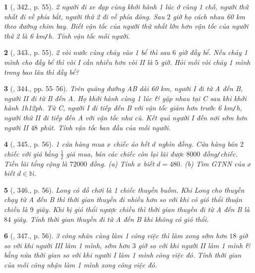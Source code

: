 \documentclass{article}
\newtheorem{baitoan}{}
\begin{document}
\begin{baitoan}[\cite{Binh_Toan_9_tap_2}, 342., p. 55]
	2 người đi xe đạp cùng khởi hành 1 lúc ở cùng 1 chỗ, người thứ nhất đi về phía bắt, người thứ 2 đi về phía đông. Sau $2$ giờ họ cách nhau {\rm60 km} theo đường chim bay. Biết vận tốc của người thứ nhất lớn hơn vận tốc của người thứ 2 là {\rm6 km{\tt/}h}. Tính vận tốc mỗi người.
\end{baitoan}

\begin{baitoan}[\cite{Binh_Toan_9_tap_2}, 343., p. 55]
	2 vòi nước cùng chảy vào 1 bể thì sau $6$ giờ đầy bể. Nếu chảy 1 mình cho đầy bể thì vòi I cần nhiều hơn vòi II là $5$ giờ. Hỏi mỗi vòi chảy 1 mình trong bao lâu thì đầy bể?
\end{baitoan}

\begin{baitoan}[\cite{Binh_Toan_9_tap_2}, 344., pp. 55--56]
	Trên quãng đường AB dài {\rm60 km}, người I đi từ A đến B, người II đi từ B đến A. Họ khởi hành cùng 1 lúc \& gặp nhau tại C sau khi khởi hành {\rm1h12ph}. Từ C, người I đi tiếp đến B với vận tốc giảm hơn trước {\rm6 km{\tt/}h}, người thứ II đi tiếp đến A với vận tốc như cũ. Kết quả người I đến nơi sớm hơn người II $48$ phút. Tính vận tốc ban đầu của mỗi người.
\end{baitoan}

\begin{baitoan}[\cite{Binh_Toan_9_tap_2}, 345., p. 56]
	1 cửa hàng mua $x$ chiếc áo hết $d$ nghìn đồng. Cửa hàng bán $2$ chiếc với giá bằng $\frac{1}{2}$ giá mua, bán các chiếc còn lại lãi được $8000$ đồng{\tt/}chiếc. Tiền lãi tổng cộng là $72000$ đồng. (a) Tính $x$ biết $d = 480$. (b) Tìm {\rm GTNN} của $x$ biết $d\in\mathbb{N}$.
\end{baitoan}

\begin{baitoan}[\cite{Binh_Toan_9_tap_2}, 346., p. 56]
	Long có đồ chơi là 1 chiếc thuyền buồm. Khi Long cho thuyền chạy từ A đến B thì thời gian thuyền đi nhiều hơn so với khi có gió thổi thuận chiều là $9$ giây. Khi bị gió thổi ngược chiều thì thời gian thuyền đi từ A đến B là $84$ giây. Tính thời gian thuyền đi từ A đến B khi không có gió thổi.
\end{baitoan}

\begin{baitoan}[\cite{Binh_Toan_9_tap_2}, 347., p. 56]
	3 công nhân cùng làm 1 công việc thì làm xong sớm hơn $18$ giờ so với khi người III làm 1 mình, sớm hơn $3$ giờ so với khi người II làm 1 mình \& bằng nửa thời gian so với khi người I làm 1 mình công việc đó. Tính thời gian của mỗi công nhận làm 1 mình xong công việc đó.
\end{baitoan}
\end{document}
